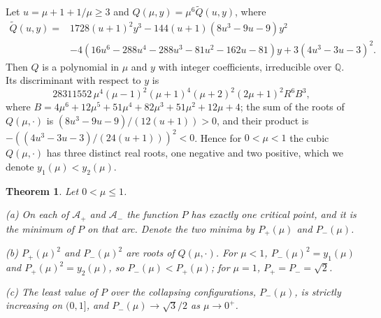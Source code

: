 \documentclass[11pt]{article}
\newtheorem{theorem}{Theorem}
\theoremstyle{definition}
\newcommand{\Q}{\mathbb{Q}}
\newcommand{\Ap}{\mathcal{A}_+}
\newcommand{\Am}{\mathcal{A}_-}
\begin{document}
Let $u = \mu + 1 + 1/\mu \ge 3$ and $Q(\mu, y) = \mu^6 \tilde Q(u, y)$, where
\begin{equation}\label{eq:Q}
\begin{split}
  \tilde Q(u, y) = {}& 1728(u + 1)^2 y^3 - 144(u + 1)(8u^3 - 9u - 9) y^2 \\
  & - 4(16u^6 - 288u^4 - 288u^3 - 81u^2 - 162u - 81) y + 3(4u^3 - 3u - 3)^2.
\end{split}
\end{equation}
Then $Q$ is a polynomial in $\mu$ and $y$ with integer coefficients, irreducible over $\Q$. Its discriminant with respect to $y$ is
\[
  28311552\, \mu^4 (\mu - 1)^2 (\mu + 1)^4 (\mu + 2)^2 (2\mu + 1)^2 R^6 B^3,
\]
where $B = 4\mu^6 + 12\mu^5 + 51\mu^4 + 82\mu^3 + 51\mu^2 + 12\mu + 4$; the sum of the roots of $Q(\mu, \cdot)$ is $(8u^3 - 9u - 9)/(12(u + 1)) > 0$, and their product is $-((4u^3 - 3u - 3)/(24(u + 1)))^2 < 0$. Hence for $0 < \mu < 1$ the cubic $Q(\mu, \cdot)$ has three distinct real roots, one negative and two positive, which we denote $y_1(\mu) < y_2(\mu)$.

\begin{theorem}\label{thm:main}
Let $0 < \mu \le 1$.

\textup{(a)} On each of $\Ap$ and $\Am$ the function $P$ has exactly one critical point, and it is the minimum of $P$ on that arc. Denote the two minima by $P_+(\mu)$ and $P_-(\mu)$.

\textup{(b)} $P_+(\mu)^2$ and $P_-(\mu)^2$ are roots of $Q(\mu, \cdot)$. For $\mu < 1$, $P_-(\mu)^2 = y_1(\mu)$ and $P_+(\mu)^2 = y_2(\mu)$, so $P_-(\mu) < P_+(\mu)$; for $\mu = 1$, $P_+ = P_- = \sqrt{2}$.

\textup{(c)} The least value of $P$ over the collapsing configurations, $P_-(\mu)$, is strictly increasing on $(0, 1]$, and $P_-(\mu) \to \sqrt{3}/2$ as $\mu \to 0^+$.
\end{theorem}
\end{document}

